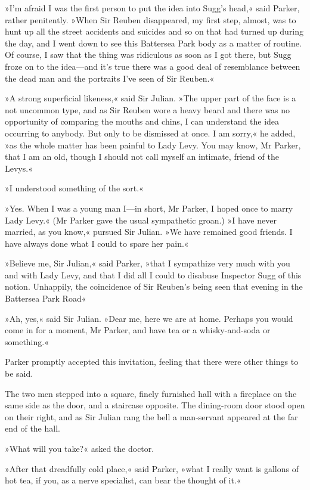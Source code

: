 »I'm afraid I was the first person to put the idea into Sugg's head,« said Parker, rather penitently. »When Sir Reuben disappeared, my first step, almost, was to hunt up all the street accidents and suicides and so on that had turned up during the day, and I went down to see this Battersea Park body as a matter of routine. Of course, I saw that the thing was ridiculous as soon as I got there, but Sugg froze on to the idea\allowbreak---\allowbreak and it's true there was a good deal of resemblance between the dead man and the portraits I've seen of Sir Reuben.«

»A strong superficial likeness,« said Sir Julian. »The upper part of the face is a not uncommon type, and as Sir Reuben wore a heavy beard and there was no opportunity of comparing the mouths and chins, I can understand the idea occurring to anybody. But only to be dismissed at once. I am sorry,« he added, »as the whole matter has been painful to Lady Levy. You may know, Mr Parker, that I am an old, though I should not call myself an intimate, friend of the Levys.«

»I understood something of the sort.«

»Yes. When I was a young man I\allowbreak---\allowbreak in short, Mr Parker, I hoped once to marry Lady Levy.« (Mr Parker gave the usual sympathetic groan.) »I have never married, as you know,« pursued Sir Julian. »We have remained good friends. I have always done what I could to spare her pain.«

»Believe me, Sir Julian,« said Parker, »that I sympathize very much with you and with Lady Levy, and that I did all I could to disabuse Inspector Sugg of this notion. Unhappily, the coincidence of Sir Reuben's being seen that evening in the Battersea Park Road\longdash«

»Ah, yes,« said Sir Julian. »Dear me, here we are at home. Perhaps you would come in for a moment, Mr Parker, and have tea or a whisky-and-soda or something.«

Parker promptly accepted this invitation, feeling that there were other things to be said.

The two men stepped into a square, finely furnished hall with a fireplace on the same side as the door, and a staircase opposite. The dining-room door stood open on their right, and as Sir Julian rang the bell a man-servant appeared at the far end of the hall.

»What will you take?« asked the doctor.

»After that dreadfully cold place,« said Parker, »what I really want is gallons of hot tea, if you, as a nerve specialist, can bear the thought of it.«

